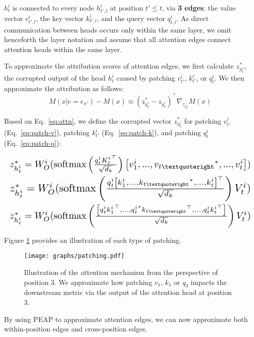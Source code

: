 $h^i_{t}$  is connected to 
 every node  $h^i_{t',l}$ at position $t' \le t$, via \textbf{3 edges}: the value vector $v^i_{t',l}$, the key vector $k^i_{t',l}$, and the query vector $q^i_{t,l}$. As direct communication between heads occurs only within the same layer, 
we omit henceforth the layer notation and assume that all attention edges connect attention heads within the same layer.


To approximate the attribution scores of attention edges, we first calculate \( z^*_{h^i_t} \), the corrupted output of the head \( h^i_t \) caused by patching \( v^i_{t'} \), \( k^i_{t'} \), or \( q^i_t \). We then approximate the attribution as follows:
\begin{equation}
    M(x| e = e_{x'}) - M(x) \approx (z^*_{h^i_{t}} - z_{h^i_{t}})^\top \nabla_{z_{h^i_{t}}} M(x) \label{eq:eap-attn}
\end{equation}

Based on Eq.~\ref{eq:attn}, we define the corrupted vector \( z^*_{h^i_t} \) for patching $v_{t'}^i$ (Eq.~\ref{eq:patch-v}), patching $k_{t'}^i$ (Eq.~\ref{eq:patch-k}), and patching $q_{t}^i$ (Eq.~\ref{eq:patch-q}):

\begin{align}
\label{eq:patch-v} \resizebox{\linewidth}{!}{$z^*_{h^i_{t}} = W^{i}_{O} (\text{softmax} \left( \frac{q^i_{t}{K^i_{t}}^\top}{\sqrt{d_k}}\right) \left[ v_1^i, ..., {v_{t’}}^*, ..., v_t^i\right])$}\\
\label{eq:patch-k} \resizebox{\linewidth}{!}{$z^*_{h^i_{t}} = W^{i}_{O} (\text{softmax} \left( \frac{q^i_{t}{\left[ k_1^i, ..., {k_{t’}}^*, ..., k_t^i \right]}^\top}{\sqrt{d_k}}\right)V^i_{t} )$}\\
\label{eq:patch-q} \resizebox{\linewidth}{!}{$z^*_{h^i_{t}} = W^{i}_{O} (\text{softmax} \left( \frac{{\left[ q^i_{t} {k_1^i}^\top, ..., {q^i_{t}}^* {k_{t’}}^\top, ..., q^i_{t} {k_t^i}^\top \right]}}{\sqrt{d_k}}\right)V^i_{t} )$}
\end{align}

Figure \ref{fig:attention_patching} provides an illustration of each type of patching. 
\begin{figure}[t]
    \centering
    \texttt{[image: graphs/patching.pdf]}
    \caption{\vspace{-2pt}
    Illustration of the attention mechanism from the perspective of position 3. We approximate how patching \textcolor[RGB]{147,145,255}{$v_1$}, \textcolor[RGB]{109,177,255}{$k_1$} or \textcolor[RGB]{255,128,223}{$q_3$} impacts the downstream metric via the output of the attention head at position 3.}
    \label{fig:attention_patching}
    \vspace{-6pt}
\end{figure}
By using PEAP to approximate attention edges, we can now approximate both within-position edges and cross-position edges.

